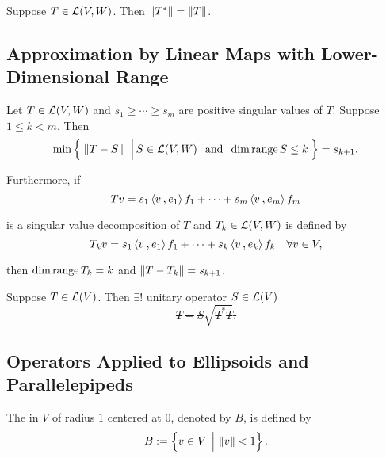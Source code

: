 \begin{thm}
  \label{thm: norm of the adjoint}
  Suppose $T \in \mathcal{L}(V,W)$. Then $\left \lVert T^* \right \rVert = \left \lVert T \right \rVert$.
\end{thm}

\subsection{Approximation by Linear Maps with Lower-Dimensional Range}

\begin{thm}
  Let $T \in \mathcal{L} (V,W)$ and $s_1 \geq \cdots \geq s_m$ are positive singular values of $T$. Suppose $1 \leq k < m$. Then
  \[
    \min \left\{ \; \left \lVert T-S \right \rVert \; \,\Big\vert\, S \in \mathcal{L} (V,W) \;\;\, \text{and}\;\; \dim \operatorname{range} S \leq k \; \right\} = s_{k+1}.
  \]

  Furthermore, if
  \[
    Tv = s_1 \ip{v}{e_1}f_1 + \cdots + s_m \ip{v}{e_m}f_m
  \]

  is a singular value decomposition of $T$ and $T_k \in \mathcal{L}(V,W)$ is defined by
  \[
    T_k v = s_1 \ip{v}{e_1}f_1 + \cdots + s_k \ip{v}{e_k}f_k \quad \forall v \in V,
  \]

  then $\dim \operatorname{range} T_k = k$ and $\left \lVert T-T_k \right \rVert = s_{k+1}$.
\end{thm}


\begin{thm}
  Suppose $T\in \mathcal{L}(V)$. Then $\exists!$ unitary operator $S\in \mathcal{L}(V)$ \st
  \[
    T=S\sqrt{T^*T}.
  \]
\end{thm}

\subsection{Operators Applied to Ellipsoids and Parallelepipeds}
\begin{thm}[ball, $B$]
  The  in $V$ of radius $1$ centered at $0$, denoted by $B$, is defined by
  \[
    B := \left\{v \in V \; \,\Big\vert\, \left \lVert v \right \rVert < 1  \right\}.
  \]
\end{thm}